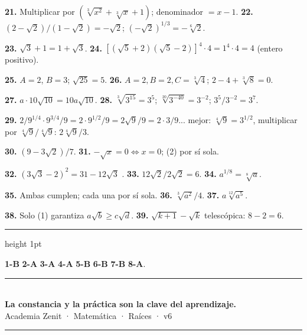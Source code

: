 \documentclass[11pt, letterpaper]{article}
\newcommand{\subbloque}[1]{%
  \vspace{14pt}
  \noindent{\large\bfseries\color{zenitnavy} #1}\par
  \vspace{4pt}\hrule height 1pt\vspace{8pt}}
\begin{document}
\textbf{21.} Multiplicar por $(\sqrt[3]{x^2}+\sqrt[3]{x}+1)$; denominador $=x-1$. \quad \textbf{22.} $(2-\sqrt{2})/(1-\sqrt{2})=-\sqrt{2}$; $(-\sqrt{2})^{1/3}=-\sqrt[6]{2}$.

\textbf{23.} $\sqrt{3}+1=1+\sqrt{3}$. \quad \textbf{24.} $[(\sqrt{5}+2)(\sqrt{5}-2)]^4\cdot4=1^4\cdot4=4$ (entero positivo).

\textbf{25.} $A=2$, $B=3$; $\sqrt{25}=5$. \quad \textbf{26.} $A=2,B=2,C=\sqrt[3]{4}$; $2-4+\sqrt[3]{8}=0$.

\textbf{27.} $a\cdot10\sqrt{10}=10a\sqrt{10}$. \quad \textbf{28.} $\sqrt[3]{3^{15}}=3^5$; $\sqrt[20]{3^{-40}}=3^{-2}$; $3^5/3^{-2}=3^7$.

\textbf{29.} $2/9^{1/4}\cdot9^{3/4}/9=2\cdot9^{1/2}/9=2\sqrt{9}/9=2\cdot3/9$... mejor: $\sqrt[4]{9}=3^{1/2}$, multiplicar por $\sqrt[4]{9}/\sqrt[4]{9}$: $2\sqrt[4]{9}/3$.

\textbf{30.} $(9-3\sqrt{2})/7$. \quad \textbf{31.} $-\sqrt{x}=0\Leftrightarrow x=0$; (2) por sí sola.

\textbf{32.} $(3\sqrt{3}-2)^2=31-12\sqrt{3}$ \checkmark{}. \quad \textbf{33.} $12\sqrt{2}/2\sqrt{2}=6$. \quad \textbf{34.} $a^{1/8}=\sqrt[8]{a}$.

\textbf{35.} Ambas cumplen; cada una por sí sola. \quad \textbf{36.} $\sqrt[3]{a^2}/4$. \quad \textbf{37.} $a\sqrt[12]{a^5}$.

\textbf{38.} Solo (1) garantiza $a\sqrt{b}\geq c\sqrt{d}$. \quad \textbf{39.} $\sqrt{k+1}-\sqrt{k}$ telescópica: $8-2=6$.

\subbloque{Alternativas}

\textbf{1-B} \quad \textbf{2-A} \quad \textbf{3-A} \quad \textbf{4-A} \quad \textbf{5-B} \quad \textbf{6-B} \quad \textbf{7-B} \quad \textbf{8-A}.

\vspace{8pt}
\begin{center}
  \rule{\linewidth}{1.5pt}\\[4pt]
  {\large\bfseries\color{zenitnavy} La constancia y la práctica son la clave del aprendizaje.}\\[2pt]
  {\color{zenitgold}\small Academia Zenit · Matemática · Raíces · v6}
  \rule{\linewidth}{1.5pt}
\end{center}
\end{document}
